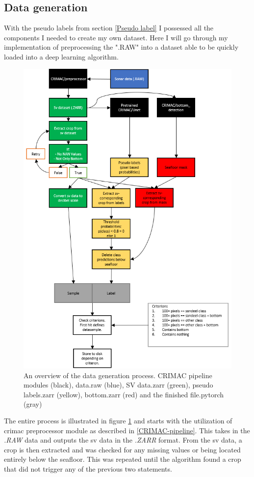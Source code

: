     \subsection{Data generation}
        With the pseudo labels from section \ref{Pseudo label} I possessed all the components I needed to create my own dataset. Here I will go through my implementation of preprocessing the ".RAW" into a dataset able to be quickly loaded into a deep learning algorithm.
        \clearpage
        \begin{figure}[H]
            \centering
            \includegraphics[scale=0.8]{figures/flow_data_gen.png}
            \caption[Data generation process]{An overview of the data generation process. CRIMAC pipeline modules (black), data.raw (blue), SV data.zarr (green), pseudo labels.zarr (yellow), bottom.zarr (red) and the finished file.pytorch (gray)}
          	\medskip 
            \label{data_generation_flowchart_fig}
        \end{figure}
        The entire process is illustrated in figure \ref{data_generation_flowchart_fig} and starts with the utilization of \gls{crimac} preprocessor module as described in \ref{CRIMAC-pipeline}. This takes in the \textit{.RAW} data and outputs the \gls{sv} data in the \textit{.ZARR} format. From the \gls{sv} data, a crop is then extracted and was checked for any missing values or being located entirely below the seafloor. This was repeated until the algorithm found a crop that did not trigger any of the previous two statements.
        
